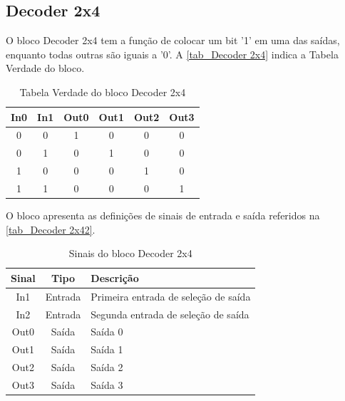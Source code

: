 \renewcommand{\NomeBloco}{Decoder 2x4}
\renewcommand{\NomePTab}{tab_\NomeBloco}
\renewcommand{\NomeSTab}{tab_\NomeBloco2}
\renewcommand{\NomePFig}{fig_\NomeBloco}
\renewcommand{\NomeSFig}{fig_\NomeBloco2}
\renewcommand{\NomeTTab}{tab_\NomeBloco3}

\subsection{\NomeBloco}

O bloco \NomeBloco{} tem a fun{\c c}\~ao de colocar um bit '1' em uma das sa\'idas, enquanto todas outras s\~ao iguais a '0'. A \autoref{\NomePTab} indica a Tabela Verdade do bloco.

\begin{table}[htbp]

\caption{Tabela Verdade do bloco \NomeBloco}%
\label{\NomePTab}
\centering
\begin{tabular}{cccccc}
    \toprule
    In0 & In1 & Out0 & Out1 & Out2 & Out3 \\
    \midrule \midrule
    0 & 0 & 1 & 0 & 0 & 0 \\
    \midrule
    0 & 1 & 0 & 1 & 0 & 0 \\
    \midrule
    1 & 0 & 0 & 0 & 1 & 0 \\
    \midrule
    1 & 1 & 0 & 0 & 0 & 1 \\
\bottomrule

\end{tabular}
\end{table}

O bloco apresenta as defini{\c c}\~oes de sinais de entrada e sa\'ida referidos na \autoref{\NomeSTab}.

\begin{table}[htbp]
\caption{Sinais do bloco \NomeBloco}
\label{\NomeSTab}
\centering
\begin{tabular}{ccl}

    \toprule
    Sinal & Tipo    & Descri{\c c}\~ao        \\
    \midrule \midrule
    In1    & Entrada & Primeira entrada de sele{\c c}\~ao de sa\'ida \\
    \midrule
    In2    & Entrada & Segunda entrada de sele{\c c}\~ao de sa\'ida \\
    \midrule
    Out0 & Sa\'ida & Sa\'ida 0\\
    \midrule
    Out1 & Sa\'ida & Sa\'ida 1\\
    \midrule
    Out2 & Sa\'ida & Sa\'ida 2\\
    \midrule
    Out3 & Sa\'ida & Sa\'ida 3\\
    \bottomrule
\end{tabular}
\end{table}

